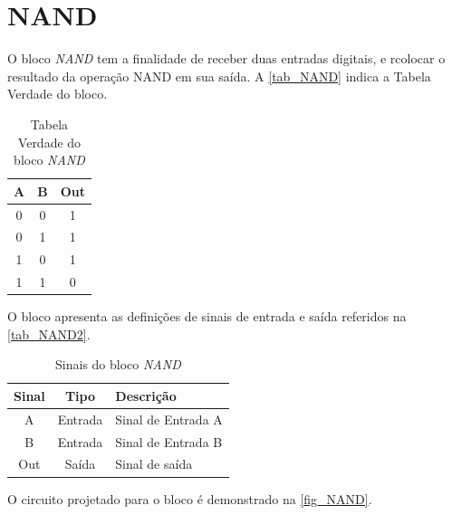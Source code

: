 \renewcommand{\NomeBloco}{\emph{NAND}}
\renewcommand{\NomeBlocoNoIt}{NAND}
\renewcommand{\NomePTab}{tab_\NomeBlocoNoIt}
\renewcommand{\NomeSTab}{tab_\NomeBlocoNoIt2}
\renewcommand{\NomePFig}{fig_\NomeBlocoNoIt}
\renewcommand{\NomeSFig}{fig_\NomeBlocoNoIt2}
\renewcommand{\NomeTTab}{tab_\NomeBlocoNoIt3}

\section{NAND}

O bloco \NomeBloco{} tem a finalidade de receber duas entradas digitais, e rcolocar o resultado da operação NAND em sua sa\'ida. A \autoref{\NomePTab} indica a Tabela Verdade do bloco.

\begin{table}[htbp]

\caption{Tabela Verdade do bloco \NomeBloco}%
\label{\NomePTab}
\centering
\begin{tabular}{ccc}
\toprule
    A & B & Out \\
    \midrule \midrule
    0 & 0 & 1 \\
    \midrule
    0 & 1 & 1\\
    \midrule
    1 & 0 & 1\\
    \midrule
    1 & 1 & 0\\
\bottomrule

\end{tabular}
\end{table}

O bloco apresenta as definições de sinais de entrada e sa\'ida referidos na \autoref{\NomeSTab}.

\begin{table}[htbp]
\caption{Sinais do bloco \NomeBloco}
\label{\NomeSTab}
\centering
\begin{tabular}{ccl}

    \toprule
    Sinal & Tipo    & Descrição        \\
    \midrule \midrule
    A    & Entrada & Sinal de Entrada A \\
    \midrule
    B    & Entrada & Sinal de Entrada B \\
    \midrule
    Out    & Sa\'ida & Sinal de sa\'ida \\
    \bottomrule
\end{tabular}
\end{table}

O circuito projetado para o bloco \'e demonstrado na \autoref{\NomePFig}.

